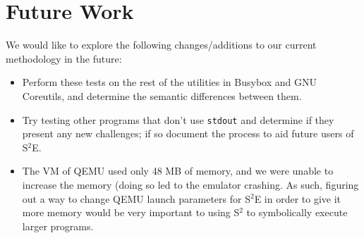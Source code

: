 \documentclass[conference]{IEEEtran}
\begin{document}

\section{Future Work}

We would like to explore the following changes/additions to our current methodology in the future: 

\begin{itemize}
  \item Perform these tests on the rest of the utilities in Busybox and GNU Coreutils, and determine the semantic differences between them.
  \item Try testing other programs that don't use {\tt stdout} and determine if they present any new challenges; if so document the process to aid future users of S$^2$E.
  \item The VM of QEMU used only 48 MB of memory, and we were unable to increase the memory (doing so led to the emulator crashing. As such, figuring out a way to change QEMU launch parameters for S$^2$E in order to give it more memory would be very important to using S$^2$ to symbolically execute larger programs.
\end{itemize}

\end{document}

